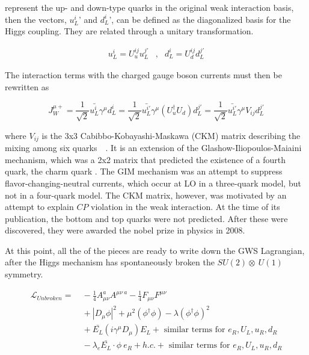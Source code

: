 \noindent represent the up- and down-type quarks in the original weak
interaction basis, then the vectors, $u_{L}^{i}$' and $d_{L}^{i}$',
can be defined as the diagonalized basis for the Higgs coupling.  They
are related through a unitary transformation.  

\begin{equation}\label{eq:ewk_quark_transformaitons}
\begin{aligned}
u_{L}^{i} = U_{u}^{ij}u_{L}^{j\prime} &,                 & d_{L}^{i} = U_{d}^{ij}d_{L}^{j\prime}
\end{aligned}
\end{equation}

\noindent The interaction terms with the charged gauge boson currents
must then be rewritten as

\begin{equation}\label{eq:ewk_ckm_intro}
J_{W}^{\mu+} = \frac{1}{\sqrt{2}}\bar{u_{L}^{i}}\gamma^{\mu}d_{L}^{i}
=
\frac{1}{\sqrt{2}}\bar{u_{L}^{i\prime}}\gamma^{\mu}(U_{u}^{\dagger}U_{d})d_{L}^{j\prime}
= \frac{1}{\sqrt{2}}\bar{u_{L}^{i\prime}}\gamma^{\mu}V_{ij}d_{L}^{j\prime}
\end{equation}

\noindent where $V_{ij}$ is the 3x3 Cabibbo-Kobayashi-Maskawa (CKM) matrix
describing the mixing among six
quarks~\cite{th:CKM_matrix_C}~\cite{th:CKM_matrix_KM}.  It is an
extension of the Glashow-Iliopoulos-Maiaini mechanism, which was a 2x2
matrix that predicted the existence of a fourth quark, the charm quark
\cite{th:GIM}.  The GIM
mechanism was an attempt to suppress flavor-changing-neutral currents,
which occur at LO in a three-quark model, but not in a four-quark
model.  The CKM matrix, however, was motivated by an attempt to
explain $CP$ violation in the weak interaction.  At the time of its
publication, the bottom and top quarks were not predicted.  After
these were discovered, they were awarded the nobel prize in physics in
2008.  

\par At this point, all the of the pieces are ready to write down the
GWS Lagrangian, after the Higgs mechanism has spontaneously broken the
$SU(2)\otimes~U(1)$ symmetry.

\begin{equation}\label{eq:ewk_lagrangian_unbroken}
\begin{aligned}
\mathcal{L}_{Unbroken} = &~ -\frac{1}{4}A_{\mu\nu}^{a}A^{\mu\nu~a} -
\frac{1}{4}F_{\mu\nu}F^{\mu\nu} \\
&~ + |D_{\mu}\phi|^{2} + \mu^{2}(\phi^{\dagger}\phi) - \lambda(\phi^{\dagger}\phi)^{2} \\
&~ + \bar{E_{L}}(i\gamma^{\mu}D_{\mu})E_{L} + \text{ similar terms for }
    e_{R}, U_{L}, u_{R}, d_{R} \\
&~ -\lambda_{e}\bar{E_{L}}\cdot\phi~e_{R} + h.c. + \text{ similar
  terms for } e_{R}, U_{L}, u_{R}, d_{R}
\end{aligned}
\end{equation}

